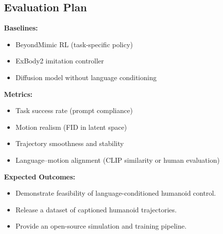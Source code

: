 \subsection{Evaluation Plan}

\textbf{Baselines:}
\begin{itemize}
    \item BeyondMimic RL (task-specific policy)
    \item ExBody2 imitation controller
    \item Diffusion model without language conditioning
\end{itemize}

\textbf{Metrics:}
\begin{itemize}
    \item Task success rate (prompt compliance)
    \item Motion realism (FID in latent space)
    \item Trajectory smoothness and stability
    \item Language–motion alignment (CLIP similarity or human evaluation)
\end{itemize}

\textbf{Expected Outcomes:}
\begin{itemize}
    \item Demonstrate feasibility of language-conditioned humanoid control.
    \item Release a dataset of captioned humanoid trajectories.
    \item Provide an open-source simulation and training pipeline.
\end{itemize}